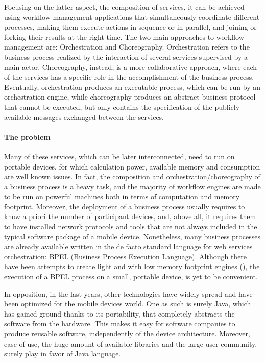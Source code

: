 Focusing on the latter aspect, the composition of services, it can be achieved using workflow management applications that simultaneously coordinate different processes, making them execute actions in sequence or in parallel, and joining or forking their results at the right time. %
The two main approaches to workflow management are: Orchestration and Choreography.
Orchestration refers to the %
business process realized by the interaction of several services supervised by a main actor. Choreography, instead, is a more collaborative approach, where each of the services has a specific role in the accomplishment of the business process. Eventually, orchestration produces an executable process, which can be run by an orchestration engine, while choreography produces an abstract business protocol that cannot be executed, but only contains the specification of the publicly available messages exchanged between the services.

\paragraph{The problem}
Many of these services, which can be later interconnected, need to run on portable devices, for which calculation power, available memory and consumption are well known issues. In fact, the composition and orchestration/choreography of a business process is a heavy task, and the majority of workflow engines are made to be run on powerful machines both in terms of computation and memory footprint. Moreover, the deployment of a business process usually requires to know a priori the number of participant devices, and, above all, it requires them to have installed network protocols and tools that are not always included in the typical software package of a mobile device. 
Nonetheless, many business processes are already available written in the de facto standard language for web services orchestration: BPEL (Business Process Execution Language). Although there have been attempts to create light and with low memory footprint engines (\cite{bpelMobileEngineMora,bpelMobileEngineHackmann06sliver:a}), the execution of a BPEL process on a small, portable device, is yet to be convenient.

In opposition, in the last years, other technologies have widely spread and have been optimized for the mobile devices world. One as such is surely Java, which has gained ground thanks to its portability, that completely abstracts the software from the hardware. This makes it easy for software companies to produce reusable software, independently of the device architecture. Moreover, ease of use, the huge amount of available libraries and the large user community, surely play in favor of Java language. 

